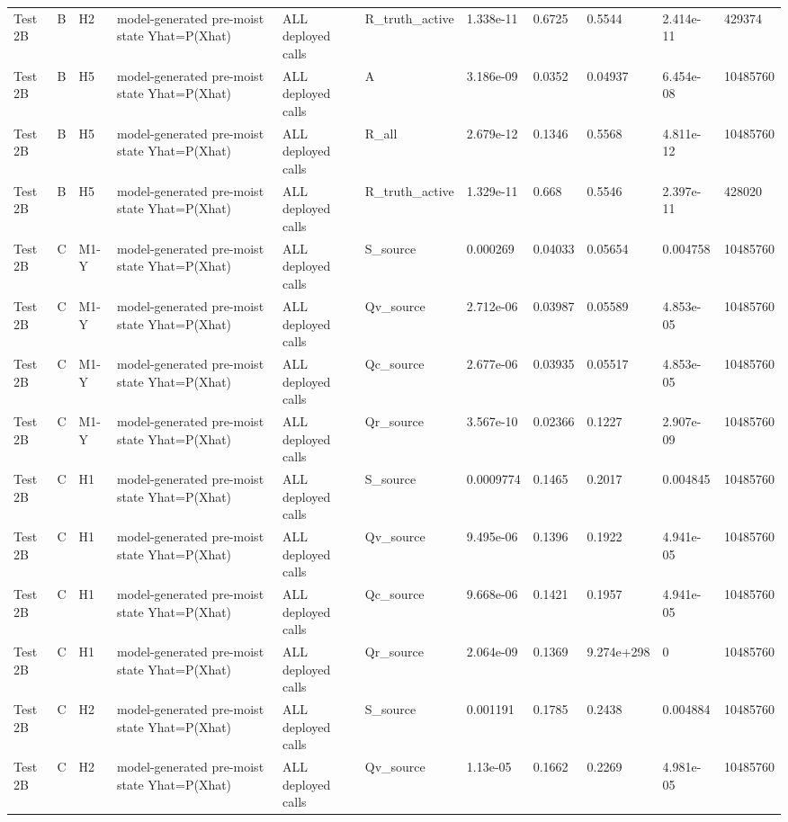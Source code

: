 \begin{tabular}{lllllllllll}
Test 2B & B & H2 & model-generated pre-moist state Yhat=P(Xhat) & ALL deployed calls & R\_truth\_active & 1.338e-11 & 0.6725 & 0.5544 & 2.414e-11 & 429374 \\
Test 2B & B & H5 & model-generated pre-moist state Yhat=P(Xhat) & ALL deployed calls & A & 3.186e-09 & 0.0352 & 0.04937 & 6.454e-08 & 10485760 \\
Test 2B & B & H5 & model-generated pre-moist state Yhat=P(Xhat) & ALL deployed calls & R\_all & 2.679e-12 & 0.1346 & 0.5568 & 4.811e-12 & 10485760 \\
Test 2B & B & H5 & model-generated pre-moist state Yhat=P(Xhat) & ALL deployed calls & R\_truth\_active & 1.329e-11 & 0.668 & 0.5546 & 2.397e-11 & 428020 \\
Test 2B & C & M1-Y & model-generated pre-moist state Yhat=P(Xhat) & ALL deployed calls & S\_source & 0.000269 & 0.04033 & 0.05654 & 0.004758 & 10485760 \\
Test 2B & C & M1-Y & model-generated pre-moist state Yhat=P(Xhat) & ALL deployed calls & Qv\_source & 2.712e-06 & 0.03987 & 0.05589 & 4.853e-05 & 10485760 \\
Test 2B & C & M1-Y & model-generated pre-moist state Yhat=P(Xhat) & ALL deployed calls & Qc\_source & 2.677e-06 & 0.03935 & 0.05517 & 4.853e-05 & 10485760 \\
Test 2B & C & M1-Y & model-generated pre-moist state Yhat=P(Xhat) & ALL deployed calls & Qr\_source & 3.567e-10 & 0.02366 & 0.1227 & 2.907e-09 & 10485760 \\
Test 2B & C & H1 & model-generated pre-moist state Yhat=P(Xhat) & ALL deployed calls & S\_source & 0.0009774 & 0.1465 & 0.2017 & 0.004845 & 10485760 \\
Test 2B & C & H1 & model-generated pre-moist state Yhat=P(Xhat) & ALL deployed calls & Qv\_source & 9.495e-06 & 0.1396 & 0.1922 & 4.941e-05 & 10485760 \\
Test 2B & C & H1 & model-generated pre-moist state Yhat=P(Xhat) & ALL deployed calls & Qc\_source & 9.668e-06 & 0.1421 & 0.1957 & 4.941e-05 & 10485760 \\
Test 2B & C & H1 & model-generated pre-moist state Yhat=P(Xhat) & ALL deployed calls & Qr\_source & 2.064e-09 & 0.1369 & 9.274e+298 & 0 & 10485760 \\
Test 2B & C & H2 & model-generated pre-moist state Yhat=P(Xhat) & ALL deployed calls & S\_source & 0.001191 & 0.1785 & 0.2438 & 0.004884 & 10485760 \\
Test 2B & C & H2 & model-generated pre-moist state Yhat=P(Xhat) & ALL deployed calls & Qv\_source & 1.13e-05 & 0.1662 & 0.2269 & 4.981e-05 & 10485760 \\

\end{tabular}
